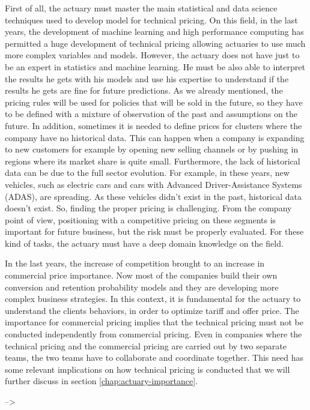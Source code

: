 \documentclass[a4paper, nobind]{templates/ociamthesis}
\theoremstyle{definition}
\theoremstyle{definition}
\theoremstyle{definition}
\theoremstyle{remark}
\begin{document}
First of all, the actuary must master the main statistical and data science techniques used to develop model for technical pricing. On this field, in the last years, the development of machine learning and high performance computing has permitted a huge development of technical pricing allowing actuaries to use much more complex variables and models. However, the actuary does not have just to be an expert in statistics and machine learning. He must be also able to interpret the results he gets with his models and use his expertise to understand if the results he gets are fine for future predictions. As we already mentioned, the pricing rules will be used for policies that will be sold in the future, so they have to be defined with a mixture of observation of the past and assumptions on the future. In addition, sometimes it is needed to define prices for clusters where the company have no historical data. This can happen when a company is expanding to new customers for example by opening new selling channels or by pushing in regions where its market share is quite small. Furthermore, the lack of historical data can be due to the full sector evolution. For example, in these years, new vehicles, such as electric cars and cars with Advanced Driver-Assistance Systems (ADAS), are spreading. As these vehicles didn't exist in the past, historical data doesn't exist. So, finding the proper pricing is challenging. From the company point of view, positioning with a competitive pricing on these segments is important for future business, but the risk must be properly evaluated. For these kind of tasks, the actuary must have a deep domain knowledge on the field.

In the last years, the increase of competition brought to an increase in commercial price importance. Now most of the companies build their own conversion and retention probability models and they are developing more complex business strategies. In this context, it is fundamental for the actuary to understand the clients behaviors, in order to optimize tariff and offer price. The importance for commercial pricing implies that the technical pricing must not be conducted independently from commercial pricing. Even in companies where the technical pricing and the commercial pricing are carried out by two separate teams, the two teams have to collaborate and coordinate together. This need has some relevant implications on how technical pricing is conducted that we will further discuss in section \ref{chap:actuary-importance}.

--\textgreater{}
\end{document}
